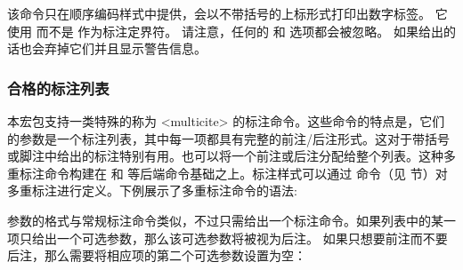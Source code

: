 \begin{ltxsyntax}

该命令只在顺序编码样式中提供，会以不带括号的上标形式打印出数字标签。
它使用   而不是  作为标注定界符。
请注意，任何的   和  选项都会被忽略。
如果给出的话也会弃掉它们并且显示警告信息。

\end{ltxsyntax}

\subsubsection{合格的标注列表}%
\label{use:cit:mlt}

本宏包支持一类特殊的称为 <multicite> 的标注命令。这些命令的特点是，它们的参数是一个标注列表，其中每一项都具有完整的前注/后注形式。这对于带括号或脚注中给出的标注特别有用。也可以将一个前注或后注分配给整个列表。这种多重标注命令构建在  和  等后端命令基础之上。标注样式可以通过 命令（见  节）对多重标注进行定义。下例展示了多重标注命令的语法:

\begin{ltxexample}
\parencites[35]{key1}[88--120]{key2}[23]{key3}
\end{ltxexample}
%
参数的格式与常规标注命令类似，不过只需给出一个标注命令。如果列表中的某一项只给出一个可选参数，那么该可选参数将被视为后注。
如果只想要前注而不要后注，那么需要将相应项的第二个可选参数设置为空：

